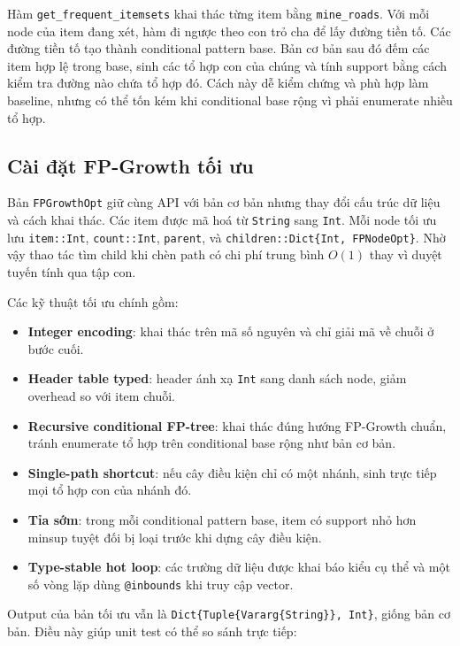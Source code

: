 Hàm \texttt{get\_frequent\_itemsets} khai thác từng item bằng \texttt{mine\_roads}. Với mỗi node của item đang xét, hàm đi ngược theo con trỏ cha để lấy đường tiền tố. Các đường tiền tố tạo thành conditional pattern base. Bản cơ bản sau đó đếm các item hợp lệ trong base, sinh các tổ hợp con của chúng và tính support bằng cách kiểm tra đường nào chứa tổ hợp đó. Cách này dễ kiểm chứng và phù hợp làm baseline, nhưng có thể tốn kém khi conditional base rộng vì phải enumerate nhiều tổ hợp.

\subsection{Cài đặt FP-Growth tối ưu}

Bản \texttt{FPGrowthOpt} giữ cùng API với bản cơ bản nhưng thay đổi cấu trúc dữ liệu và cách khai thác. Các item được mã hoá từ \texttt{String} sang \texttt{Int}. Mỗi node tối ưu lưu \texttt{item::Int}, \texttt{count::Int}, \texttt{parent}, và \texttt{children::Dict\{Int, FPNodeOpt\}}. Nhờ vậy thao tác tìm child khi chèn path có chi phí trung bình $O(1)$ thay vì duyệt tuyến tính qua tập con.

Các kỹ thuật tối ưu chính gồm:

\begin{itemize}
    \item \textbf{Integer encoding}: khai thác trên mã số nguyên và chỉ giải mã về chuỗi ở bước cuối.
    \item \textbf{Header table typed}: header ánh xạ \texttt{Int} sang danh sách node, giảm overhead so với item chuỗi.
    \item \textbf{Recursive conditional FP-tree}: khai thác đúng hướng FP-Growth chuẩn, tránh enumerate tổ hợp trên conditional base rộng như bản cơ bản.
    \item \textbf{Single-path shortcut}: nếu cây điều kiện chỉ có một nhánh, sinh trực tiếp mọi tổ hợp con của nhánh đó.
    \item \textbf{Tỉa sớm}: trong mỗi conditional pattern base, item có support nhỏ hơn minsup tuyệt đối bị loại trước khi dựng cây điều kiện.
    \item \textbf{Type-stable hot loop}: các trường dữ liệu được khai báo kiểu cụ thể và một số vòng lặp dùng \texttt{@inbounds} khi truy cập vector.
\end{itemize}

Output của bản tối ưu vẫn là \texttt{Dict\{Tuple\{Vararg\{String\}\}, Int\}}, giống bản cơ bản. Điều này giúp unit test có thể so sánh trực tiếp:


